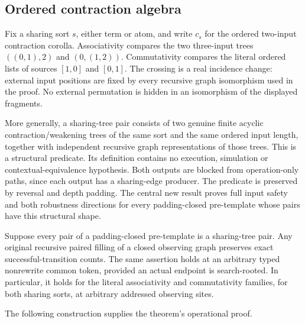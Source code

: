 \par{}

\subsection{Ordered contraction algebra}
Fix a sharing sort $s$, either term or atom, and write $c_s$ for the
ordered two-input contraction corolla. Associativity compares the two
three-input trees $((0,1),2)$ and $(0,(1,2))$. Commutativity compares the
literal ordered lists of sources $[1,0]$ and $[0,1]$. The crossing is a real
incidence change: external input positions are fixed by every recursive
graph isomorphism used in the proof. No external permutation is hidden in
an isomorphism of the displayed fragments.

More generally, a sharing-tree pair consists of two genuine finite acyclic
contraction/weakening trees of the same sort and the same ordered input
length, together with independent recursive graph representations of those
trees. This is a structural predicate. Its definition contains no execution,
simulation or contextual-equivalence hypothesis. Both outputs are blocked
from operation-only paths, since each output has a sharing-edge producer.
The predicate is preserved by reversal and depth padding. The central new
result proves full input safety and both robustness directions for every
padding-closed pre-template whose pairs have this structural shape.

\begin{theorem}
Suppose every pair of a padding-closed pre-template is a sharing-tree pair.
Any original recursive paired filling of a closed observing graph preserves
exact successful-transition counts. The same assertion holds at an arbitrary
typed nonrewrite common token, provided an actual endpoint is search-rooted.
In particular, it holds for the literal associativity and commutativity
families, for both sharing sorts, at arbitrary addressed observing sites.
\end{theorem}
The following construction supplies the theorem's operational proof.


